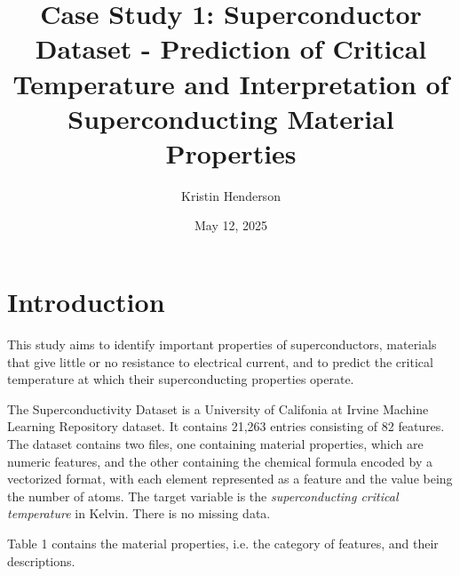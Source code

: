 \documentclass{article}      %
\title{Case Study 1: Superconductor Dataset - Prediction of Critical Temperature and Interpretation of Superconducting Material Properties}  %
\author{Kristin Henderson}   %
\date{May 12, 2025}          %
\begin{document}

\maketitle                   %

\section{Introduction}       %

This study aims to identify important properties of superconductors, materials that give little or no resistance to electrical current, and to predict the critical temperature at which their superconducting properties operate.

The Superconductivity Dataset is a University of Califonia at Irvine Machine Learning Repository dataset. It contains 21,263 entries consisting of 82 features. The dataset contains two files, one containing material properties, which are numeric features, and the other containing the chemical formula encoded by a vectorized format, with each element represented as a feature and the value being the number of atoms. The target variable is the \emph{superconducting critical temperature} in Kelvin. There is no missing data.

Table 1 contains the material properties, i.e. the category of features, and their descriptions.
\end{document}
